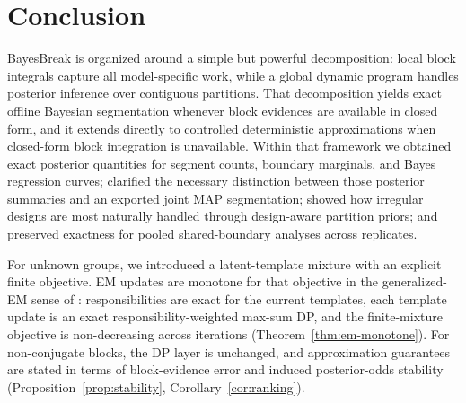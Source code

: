 \section{Conclusion}
\label{sec:conclusion}

BayesBreak is organized around a simple but powerful decomposition: local block integrals capture
all model-specific work, while a global dynamic program handles posterior inference over contiguous
partitions. That decomposition yields exact offline Bayesian segmentation whenever block evidences
are available in closed form, and it extends directly to controlled deterministic approximations
when closed-form block integration is unavailable. Within that framework we obtained exact posterior
quantities for segment counts, boundary marginals, and Bayes regression curves; clarified the
necessary distinction between those posterior summaries and an exported joint MAP segmentation;
showed how irregular designs are most naturally handled through design-aware partition priors;
and preserved exactness for pooled shared-boundary analyses across replicates.

For unknown groups, we introduced a latent-template mixture with an explicit finite objective.
EM updates are monotone for that objective in the generalized-EM sense of
\citet{dempster1977em}: responsibilities are exact for the current templates, each template
update is an exact responsibility-weighted max-sum DP, and the finite-mixture objective is
non-decreasing across iterations (Theorem~\ref{thm:em-monotone}). For non-conjugate blocks, the
DP layer is unchanged, and approximation guarantees are stated in terms of block-evidence error
and induced posterior-odds stability (Proposition~\ref{prop:stability},
Corollary~\ref{cor:ranking}).

